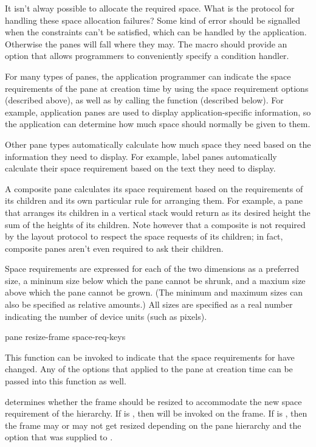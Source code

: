  {It isn't alway possible to allocate the required space.  What is
the protocol for handling these space allocation failures?  Some kind of error
should be signalled when the constraints can't be satisfied, which can be
handled by the application.  Otherwise the panes will fall where they may.  The
 macro should provide an option that allows
programmers to conveniently specify a condition handler.}

For many types of panes, the application programmer can indicate the space
requirements of the pane at creation time by using the space requirement options
(described above), as well as by calling the 
function (described below).  For example, application panes are used to display
application-specific information, so the application can determine how much
space should normally be given to them.

Other pane types automatically calculate how much space they need based on the
information they need to display.  For example, label panes automatically
calculate their space requirement based on the text they need to display.

A composite pane calculates its space requirement based on the requirements of
its children and its own particular rule for arranging them.  For example, a
pane that arranges its children in a vertical stack would return as its desired
height the sum of the heights of its children.  Note however that a composite is
not required by the layout protocol to respect the space requests of its
children; in fact, composite panes aren't even required to ask their children.

Space requirements are expressed for each of the two dimensions as a preferred
size, a mininum size below which the pane cannot be shrunk, and a maxium size
above which the pane cannot be grown.  (The minimum and maximum sizes can also
be specified as relative amounts.)  All sizes are specified as a real number
indicating the number of device units (such as pixels).

 {pane \key resize-frame \rest space-req-keys} 

This function can be invoked to indicate that the space requirements for
 have changed.  Any of the options that applied to the pane at
creation time can be passed into this function as well.

 determines whether the frame should be resized to accommodate
the new space requirement of the hierarchy.  If  is
, then  will be invoked on the frame.  If
 is , then the frame may or may not get resized
depending on the pane hierarchy and the  option that was
supplied to .

